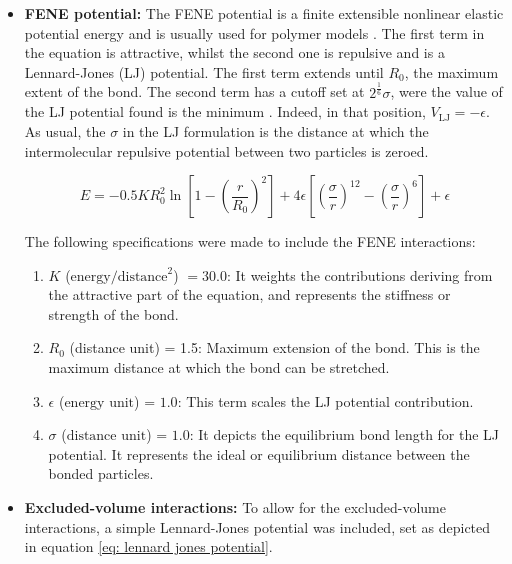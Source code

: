 \begin{itemize}
    \item \textbf{FENE potential: }The FENE potential is a finite extensible nonlinear elastic potential energy and is usually used for polymer models
    \cite{steveplimptonLAMMPS,thompsonLAMMPSFlexibleSimulation2022}. 
    The first term in the equation is attractive, whilst the second one is repulsive and is a Lennard-Jones (LJ) potential. The first term extends until $R_0$, the maximum extent of the bond. The second term has a cutoff set at $2^{\frac{1}{6}} \sigma$, were the value of the LJ potential found is the minimum
    \cite{thompsonLAMMPSFlexibleSimulation2022}. 
    Indeed, in that position, $V_{\text{LJ}} = -\epsilon$. As usual, the $\sigma$ in the LJ formulation is the distance at which the intermolecular repulsive potential between two particles is zeroed.

    \begin{equation} \label{eq: FENE potential}
        E = -0.5 K R_0^2 \ln{\left[1 - \left(\frac{r}{R_0}\right)^2\right]} + 4 \epsilon \left[\left(\frac{\sigma}{r}\right)^{12} - \left(\frac{\sigma}{r}\right)^6\right] + \epsilon
    \end{equation}

    The following specifications were made to include the FENE interactions:
    \begin{enumerate} %
        \item $K$ ($\text{energy}/\text{distance}^2$) $= 30.0$: It weights the contributions deriving from the attractive part of the equation, and represents the stiffness or strength of the bond.
        \item $R_0$ (distance unit) = 1.5: Maximum extension of the bond. This is the maximum distance at which the bond can be stretched.
        \item $\epsilon$ ($\text{energy unit}$) = $1.0$: This term scales the LJ potential contribution.
        \item $\sigma$ ($\text{distance unit}$) = $1.0$: It depicts the equilibrium bond length for the LJ potential. It represents the ideal or equilibrium distance between the bonded particles.
    \end{enumerate}

    \item \textbf{Excluded-volume interactions: } To allow for the excluded-volume interactions, a simple Lennard-Jones potential was included, set as depicted in equation \ref{eq: lennard jones potential}. %


\end{itemize}
